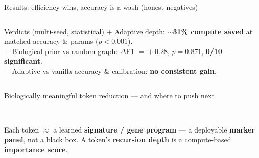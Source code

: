 \documentclass[aspectratio=169,11pt]{beamer}
\newcommand{\good}[1]{\textcolor{accentA}{\textbf{#1}}}
\newcommand{\bad}[1]{\textcolor{neg}{\textbf{#1}}}
\newcommand{\comp}[1]{\textcolor{accentB}{\textbf{#1}}}
\begin{document}
\begin{frame}{Results: efficiency wins, accuracy is a wash (honest negatives)}
\begin{columns}[T]
\begin{block}{\footnotesize Verdicts (multi-seed, statistical)}
\scriptsize
\comp{$+$} Adaptive depth: \comp{$\sim$31\% compute saved} at matched accuracy \& params ($p\!<\!0.001$).\\[2pt]
\bad{$-$} Biological prior vs random-graph: $\Delta$F1 $=\!+0.28$, $p\!=\!0.871$, \bad{0/10 significant}.\\[2pt]
\bad{$-$} Adaptive vs vanilla accuracy \& calibration: \bad{no consistent gain}.
\end{block}
\end{columns}
\end{frame}

\begin{frame}{Biologically meaningful token reduction --- and where to push next}
\begin{columns}[T]
\centering
{}
\vspace{1mm}\\
{\scriptsize Each token $\approx$ a learned \good{signature / gene program} --- a deployable \good{marker panel}, not a black box. A token's \good{recursion depth} is a compute-based \good{importance score}.}


\end{columns}
\end{frame}
\end{document}
